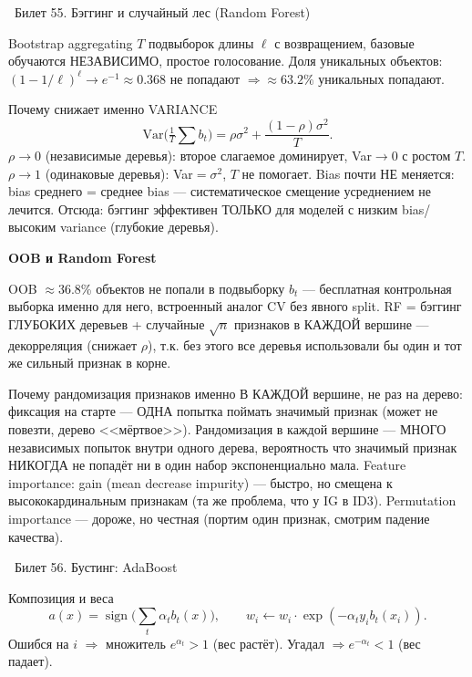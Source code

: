 \documentclass[12pt, a4paper]{article}
\newcommand{\bilet}[2]{%
  \vspace{10pt}%
  \noindent\colorbox{qcolor}{\parbox{\dimexpr\linewidth-2\fboxsep\relax}{%
    \color{white}\large\bfseries\strut\ Билет #1. #2%
  }}%
  \nopagebreak\vspace{5pt}\par\nopagebreak%
}
\newcommand{\qsub}[1]{%
  \vspace{5pt}%
  {\bfseries\color{defblue} #1}%
  \par\vspace{2pt}%
}
\newcommand{\sign}{\operatorname{sign}}
\begin{document}
\bilet{55}{Бэггинг и случайный лес (Random Forest)}

\begin{defbox}{Bootstrap aggregating}
$T$ подвыборок длины $\ell$ с возвращением, базовые обучаются НЕЗАВИСИМО, простое голосование. Доля уникальных объектов: $(1-1/\ell)^\ell\to e^{-1}\approx0.368$ не попадают $\Rightarrow \approx63.2\%$ уникальных попадают.
\end{defbox}

\begin{proofbox}{Почему снижает именно VARIANCE}
\[
  \text{Var}\Big(\tfrac1T\sum b_t\Big) = \rho\sigma^2 + \frac{(1-\rho)\sigma^2}{T}.
\]
$\rho\to0$ (независимые деревья): второе слагаемое доминирует, Var$\to0$ с ростом $T$. $\rho\to1$ (одинаковые деревья): Var$=\sigma^2$, $T$ не помогает. Bias почти НЕ меняется: bias среднего = среднее bias --- систематическое смещение усреднением не лечится. Отсюда: бэггинг эффективен ТОЛЬКО для моделей с низким bias/высоким variance (глубокие деревья).
\end{proofbox}

\qsub{OOB и Random Forest}
OOB $\approx$36.8\% объектов не попали в подвыборку $b_t$ --- бесплатная контрольная выборка именно для него, встроенный аналог CV без явного split. RF = бэггинг ГЛУБОКИХ деревьев + случайные $\sqrt n$ признаков в КАЖДОЙ вершине --- декорреляция (снижает $\rho$), т.к. без этого все деревья использовали бы один и тот же сильный признак в корне.

\begin{fishkabox}
Почему рандомизация признаков именно В КАЖДОЙ вершине, не раз на дерево: фиксация на старте --- ОДНА попытка поймать значимый признак (может не повезти, дерево <<мёртвое>>). Рандомизация в каждой вершине --- МНОГО независимых попыток внутри одного дерева, вероятность что значимый признак НИКОГДА не попадёт ни в один набор экспоненциально мала.
Feature importance: gain (mean decrease impurity) --- быстро, но смещена к высококардинальным признакам (та же проблема, что у IG в ID3). Permutation importance --- дороже, но честная (портим один признак, смотрим падение качества).
\end{fishkabox}

\bilet{56}{Бустинг: AdaBoost}

\begin{defbox}{Композиция и веса}
\[
  a(x)=\sign\Big(\sum_t\alpha_tb_t(x)\Big), \qquad w_i \leftarrow w_i\cdot\exp(-\alpha_t y_i b_t(x_i)).
\]
Ошибся на $i$ $\Rightarrow$ множитель $e^{\alpha_t}>1$ (вес растёт). Угадал $\Rightarrow e^{-\alpha_t}<1$ (вес падает).
\end{defbox}
\end{document}
